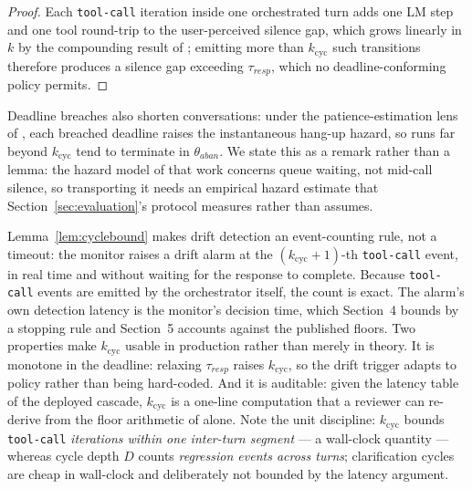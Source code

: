 \begin{proof}
Each \texttt{tool-call} iteration inside one orchestrated turn adds one LM step and one
tool round-trip to the user-perceived silence gap, which grows linearly in $k$ by the compounding
result of \citet{garcia2026latencyfloor}; emitting more than $k_{\mathrm{cyc}}$ such transitions
therefore produces a silence gap exceeding $\tau_{resp}$, which no deadline-conforming policy
permits.
\end{proof}

\begin{remark}
Deadline breaches also shorten conversations: under the patience-estimation lens of
\citet{silentabandonment2024}, each breached deadline raises the instantaneous hang-up hazard, so
runs far beyond $k_{\mathrm{cyc}}$ tend to terminate in $\theta_{aban}$.
We state this as a remark rather than a lemma: the hazard model of that work concerns queue
waiting, not mid-call silence, so transporting it needs an empirical hazard estimate that
Section~\ref{sec:evaluation}'s protocol measures rather than assumes.
\end{remark}

\begin{remark}
\label{rem:drift_trigger}
Lemma~\ref{lem:cyclebound} makes drift detection an event-counting rule, not a timeout: the
monitor raises a drift alarm at the $(k_{\mathrm{cyc}}{+}1)$-th \texttt{tool-call} event, in real
time and without waiting for the response to complete.
Because \texttt{tool-call} events are emitted by the orchestrator itself, the count is exact.
The alarm's own detection latency is the monitor's decision time, which Section~4 bounds by a
stopping rule and Section~5 accounts against the published floors.
Two properties make $k_{\mathrm{cyc}}$ usable in production rather than merely in theory.
It is monotone in the deadline: relaxing $\tau_{resp}$ raises $k_{\mathrm{cyc}}$, so the drift
trigger adapts to policy rather than being hard-coded.
And it is auditable: given the latency table of the deployed cascade, $k_{\mathrm{cyc}}$ is a
one-line computation that a reviewer can re-derive from the floor arithmetic of
\citet{garcia2026latencyfloor} alone.
Note the unit discipline: $k_{\mathrm{cyc}}$ bounds \texttt{tool-call} \emph{iterations within one
inter-turn segment} --- a wall-clock quantity --- whereas cycle depth $D$ counts \emph{regression
events across turns}; clarification cycles are cheap in wall-clock and deliberately not bounded by
the latency argument.
\end{remark}

